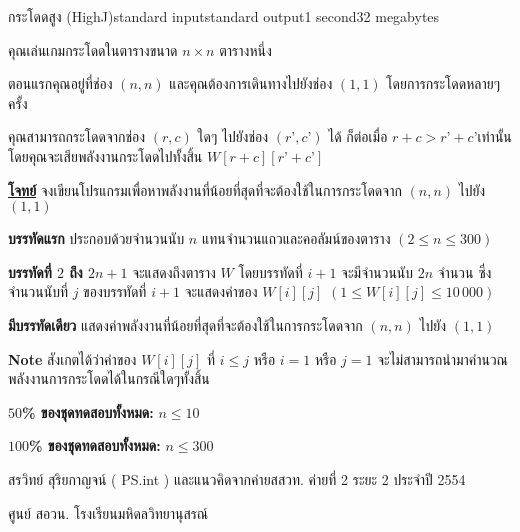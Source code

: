 \documentclass[11pt,a4paper]{article}
\begin{document}
\begin{problem}{กระโดดสูง (HighJ)}{standard input}{standard output}{1 second}{32 megabytes}

คุณเล่นเกมกระโดดในตารางขนาด $n \times n$ ตารางหนึ่ง

            ตอนแรกคุณอยู่ที่ช่อง $(n,n)$ และคุณต้องการเดินทางไปยังช่อง $(1,1)$ โดยการกระโดดหลายๆครั้ง
            
            คุณสามารถกระโดดจากช่อง $(r,c)$ ใดๆ ไปยังช่อง $(r’,c’)$ ได้ ก็ต่อเมื่อ $r+c > r’+c’$เท่านั้น โดยคุณจะเสียพลังงานกระโดดไปทั้งสิ้น  $W[ r+c ][ r’+c’ ]$

            



\bigskip
\underline{\textbf{โจทย์}}  จงเขียนโปรแกรมเพื่อหาพลังงานที่น้อยที่สุดที่จะต้องใช้ในการกระโดดจาก $(n,n)$ ไปยัง $(1,1)$


\InputFile

\textbf{บรรทัดแรก} ประกอบด้วยจำนวนนับ $n$ แทนจำนวนแถวและคอลัมน์ของตาราง $( 2 \leq n \leq 300 )$

\textbf{บรรทัดที่ $2$ ถึง $2n+1$} จะแสดงถึงตาราง $W$ โดยบรรทัดที่ $i+1$ จะมีจำนวนนับ $2n$ จำนวน ซึ่งจำนวนนับที่ $j$ ของบรรทัดที่ $i+1$ จะแสดงค่าของ  $W[ i ][ j ]$  $( 1 \leq W[ i ][ j ] \leq 10\,000 )$


\OutputFile

\textbf{มีบรรทัดเดียว} แสดงค่าพลังงานที่น้อยที่สุดที่จะต้องใช้ในการกระโดดจาก $(n,n)$ ไปยัง $(1,1)$

\bigskip
\textbf{Note} สังเกตได้ว่าค่าของ $W[ i ][ j ]$ ที่ $i \leq j$ หรือ $i = 1$ หรือ $j = 1$ จะไม่สามารถนำมาคำนวณพลังงานการกระโดดได้ในกรณีใดๆทั้งสิ้น

\Examples

\begin{example}
%
%
\end{example}

\Scoring 

\textbf{$50$\% ของชุดทดสอบทั้งหมด:} $n \leq 10$

           \textbf{ $100$\% ของชุดทดสอบทั้งหมด:} $n \leq 300$

  
\Source

สรวิทย์  สุริยกาญจน์ ( PS.int ) และแนวคิดจากค่ายสสวท. ค่ายที่ 2 ระยะ 2 ประจำปี 2554

ศูนย์ สอวน. โรงเรียนมหิดลวิทยานุสรณ์


\end{problem}
\end{document}
